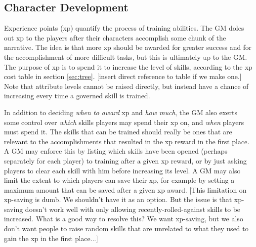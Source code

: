 \documentclass[12pt]{article}
\newcommand{\notes}[1]{{\color{Tan} #1}}
\begin{document}







\subsection{Character Development}\label{sec:dev}

Experience points (xp) quantify the process of training abilities.
The GM doles out xp to the players after their characters accomplish some chunk of the narrative.
The idea is that more xp should be awarded for greater success and for the accomplishment of more difficult tasks,
but this is ultimately up to the GM.
The purpose of xp is to spend it to increase the level of skills, according to the xp cost table in section \ref{sec:tree}.
\notes{[insert direct reference to table if we make one.]}
Note that attribute levels cannot be raised directly, but instead have a chance of increasing every time a governed skill is trained.

In addition to deciding \emph{when to award} xp and \emph{how much},
the GM also exerts some control over \emph{which} skills players may spend their xp on, and \emph{when} players must spend it.
The skills that can be trained should really be ones that are relevant to the accomplishments that resulted in the xp reward in the first place.
A GM may enforce this by listing which skills have been opened (perhaps separately for each player) to training after a given xp reward,
or by just asking players to clear each skill with him before increasing its level.
A GM may also limit the extent to which players can save their xp, for example by setting a maximum amount that can be saved after a given xp award.
\notes{[This limitation on xp-saving is dumb. We shouldn't have it as an option.
But the issue is that xp-saving doesn't work well with only allowing recently-rolled-against skills to be increased.
What is a good way to resolve this?
We want xp-saving, but we also don't want people to raise random skills that are unrelated to what they used to gain the xp in the first place...]}
\end{document}
